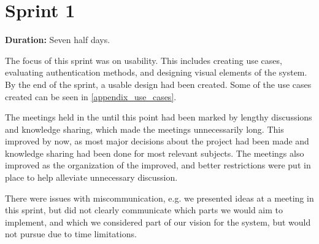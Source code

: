 \section{Sprint 1}%
\label{iterative:sprint1}

\textbf{Duration:} Seven half days. \newline

The focus of this sprint was on usability. 
This includes creating use cases, evaluating authentication methods, and designing visual elements of the system. 
By the end of the sprint, a usable design had been created. 
Some of the use cases created can be seen in \autoref{appendix_use_cases}. 

The meetings held in the \globalgroup{} until this point had been marked by lengthy discussions and knowledge sharing, which made the meetings unnecessarily long. 
This improved by now, as most major decisions about the project had been made and knowledge sharing had been done for most relevant subjects. 
The meetings also improved as the organization of the \globalgroup{} improved, and better restrictions were put in place to help alleviate unnecessary discussion. 

There were issues with miscommunication, e.g. we presented ideas at a meeting in this sprint, but did not clearly communicate which parts we would aim to implement, and which we considered part of our vision for the system, but would not pursue due to time limitations. 